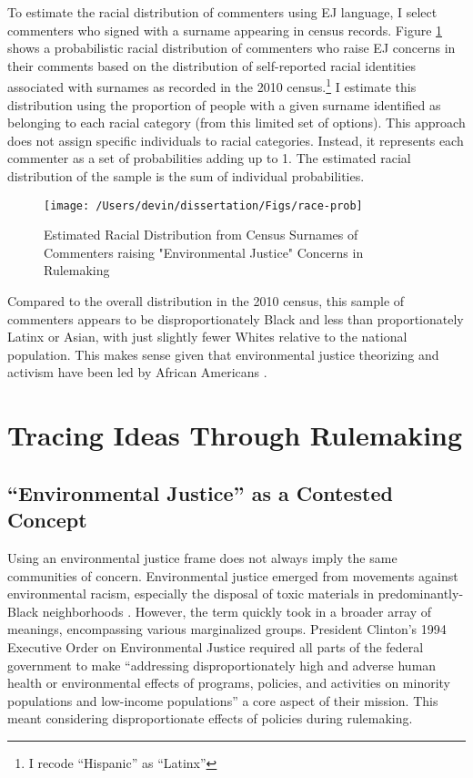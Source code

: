 \documentclass[
      12pt,
        ]{article}
\begin{document}
To estimate the racial distribution of commenters
using EJ language, I select commenters who
signed with a
surname appearing in census records. Figure
\ref{fig:ejcommentsbyrace} shows a probabilistic racial
distribution of commenters who raise EJ concerns in
their comments based on the distribution of self-reported racial identities
associated with surnames as recorded in the 2010 census.\footnote{I recode ``Hispanic'' as ``Latinx''} I estimate this distribution using the proportion of people with a given surname identified as belonging to each racial
category (from this limited set of options). This approach does not
assign specific individuals to racial categories. Instead, it represents each commenter as a set of probabilities adding up to 1. The estimated racial distribution of the sample is the sum of individual probabilities.

\begin{figure}

{\centering \texttt{[image: /Users/devin/dissertation/Figs/race-prob]} 

}

\caption{Estimated Racial Distribution from Census Surnames of Commenters raising "Environmental Justice" Concerns in Rulemaking}\label{fig:ejcommentsbyrace}
\end{figure}

Compared to the overall distribution in the 2010 census, this sample of commenters
appears to be disproportionately Black and less than proportionately
Latinx or Asian, with just slightly fewer Whites relative to the
national population. This makes sense given that environmental justice
theorizing and activism have been led by African Americans
\citep{Bullard1993}.

\hypertarget{tracing-ideas-through-rulemaking}{%
\section{Tracing Ideas Through Rulemaking}\label{tracing-ideas-through-rulemaking}}

\hypertarget{environmental-justice-as-a-contested-concept}{%
\subsection{``Environmental Justice'' as a Contested Concept}\label{environmental-justice-as-a-contested-concept}}

Using an environmental justice frame does not always imply the same
communities of concern. Environmental justice emerged from movements
against environmental racism, especially the disposal of toxic
materials in predominantly-Black neighborhoods \citep{Bullard1993}. However, the term
quickly took in a broader array of meanings, encompassing various marginalized groups. President Clinton's 1994 Executive Order on
Environmental Justice required all parts of the federal government
to make ``addressing disproportionately high and adverse human health or
environmental effects of programs, policies, and activities on minority
populations and low-income populations'' a core aspect of their mission.
This meant considering disproportionate effects of policies during rulemaking.
\end{document}
